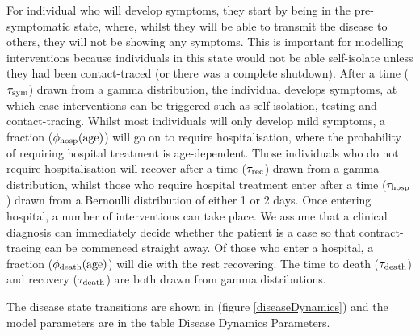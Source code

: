 \documentclass[11pt, oneside]{amsart}   	%
\begin{document}
For individual who will develop symptoms, they start by being in the pre-symptomatic state, where, whilst they will be able to transmit the disease to others, they will not be showing any symptoms. 
This is important for modelling interventions because individuals in this state would not be able self-isolate unless they had been contact-traced (or there was a complete shutdown).
After a time ($\tau_{\rm sym}$) drawn from a gamma distribution, the individual develops symptoms, at which case interventions can be triggered such as self-isolation, testing and contact-tracing.
Whilst most individuals will only develop mild symptoms, a fraction ($\phi_{\rm hosp}({\rm age})$) will go on to require hospitalisation, where the probability of requiring hospital treatment is age-dependent.
Those individuals who do not require hospitalisation will recover after a time ($\tau_{\rm rec}$) drawn from a gamma distribution, whilst those who require hospital treatment enter after a time ($\tau_{\rm hosp}$) drawn from a Bernoulli distribution of either 1 or 2 days.
Once entering hospital, a number of interventions can take place. 
We assume that a clinical diagnosis can immediately decide whether the patient is a case so that contract-tracing can be commenced straight away.
Of those who enter a hospital, a fraction ($\phi_{\rm death}({\rm age})$) will die with the rest recovering. 
The time to death ($\tau_{\rm death}$) and recovery ($\tau_{\rm death}$) are both drawn from gamma distributions.

The disease state transitions are shown in (figure \ref{diseaseDynamics}) and the model parameters are in the table Disease Dynamics Parameters.
\end{document}
